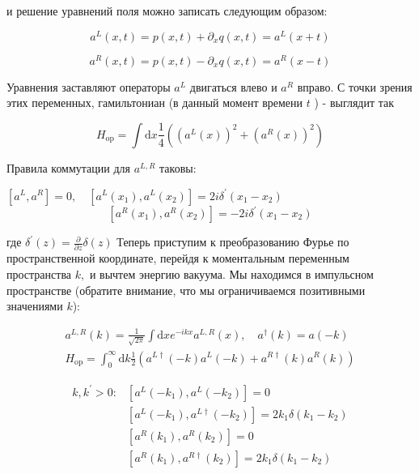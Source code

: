 \documentclass[main.tex]{subfiles}
\begin{document}
и решение уравнений поля можно записать следующим образом:

\begin{equation}\label{17.5}
a^{L}(x, t)=p(x, t)+\partial_{x} q(x, t)=a^{L}(x+t)
\end{equation}

\begin{equation}\label{17.6}
a^{R}(x, t)=p(x, t)-\partial_{x} q(x, t)=a^{R}(x-t)
\end{equation}

Уравнения заставляют операторы $a^{L}$ двигаться влево и $a^{R}$ вправо. С точки зрения этих переменных, гамильтониан (в данный момент времени $t$ ) - выглядит так

\begin{equation}\label{17.7}
H_{\mathrm{op}}=\int \mathrm{d} x \frac{1}{4}\left(\left(a^{L}(x)\right)^{2}+\left(a^{R}(x)\right)^{2}\right)
\end{equation}

Правила коммутации для $a^{L, R}$ таковы:

$\left[a^{L}, a^{R}\right]=0, \quad\left[a^{L}\left(x_{1}\right), a^{L}\left(x_{2}\right)\right]=2 i \delta^{\prime}\left(x_{1}-x_{2}\right)$
\begin{equation}\label{17.8}
\left[a^{R}\left(x_{1}\right), a^{R}\left(x_{2}\right)\right]=-2 i \delta^{\prime}\left(x_{1}-x_{2}\right)
\end{equation}

где $\delta^{\prime}(z)=\frac{\partial}{\partial z} \delta(z)$
Теперь приступим к преобразованию Фурье по пространственной координате, перейдя к моментальным переменным пространства $k,$ и вычтем энергию вакуума. Мы находимся в импульсном пространстве (обратите внимание, что мы ограничиваемся позитивными значениями $k$):

\begin{equation}\label{17.9}
	\begin{array}{l}{a^{L, R}(k)=\frac{1}{\sqrt{2 \pi}} \int \mathrm{d} x e^{-i k x} a^{L, R}(x), \quad a^{\dagger}(k)=a(-k)} \\ {H_{\mathrm{op}}=\int_{0}^{\infty} \mathrm{d} k \frac{1}{2}\left(a^{L \dagger}(-k) a^{L}(-k)+a^{R \dagger}(k) a^{R}(k)\right)}\end{array}
\end{equation}

\begin{equation}\label{17.11}
	\begin{aligned} k, k^{\prime}>0: &\left[a^{L}\left(-k_{1}\right), a^{L}\left(-k_{2}\right)\right]=0 \\ &\left[a^{L}\left(-k_{1}\right), a^{L \dagger}\left(-k_{2}\right)\right]=2 k_{1} \delta\left(k_{1}-k_{2}\right) \\ &\left[a^{R}\left(k_{1}\right), a^{R}\left(k_{2}\right)\right]=0 \\ &\left[a^{R}\left(k_{1}\right), a^{R \dagger}\left(k_{2}\right)\right]=2 k_{1} \delta\left(k_{1}-k_{2}\right) \end{aligned}
\end{equation}
\end{document}
